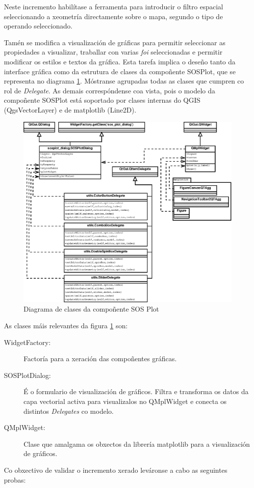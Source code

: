 Neste incremento habilítase a ferramenta para introducir o filtro espacial seleccionando a xeometría directamente sobre o mapa, segundo o tipo de operando seleccionado.

Tamén se modifica a visualización de gráficas para permitir seleccionar as propiedades a visualizar, traballar con varias \emph{foi} seleccionadas e permitir modificar os estilos e textos da gráfica. Esta tarefa implica o deseño tanto da interface gráfica como da estrutura de clases da compoñente SOSPlot, que se representa no diagrama \ref{fig:diaClassSOSPlot}. Móstranse agrupadas todas as clases que cumpren co rol de \emph{Delegate}. As demais correspóndense coa vista, pois o modelo da compoñente SOSPlot está soportado por clases internas do QGIS (QgsVectorLayer) e de matplotlib (Line2D).

\begin{figure}
 \centering
 \includegraphics[width=\textwidth]{images/clases_sos_plot.eps}
 \caption{Diagrama de clases da compoñente SOS Plot}
 \label{fig:diaClassSOSPlot}
\end{figure}

As clases máis relevantes da figura \ref{fig:diaClassSOSPlot} son:
\begin{description}
\item[WidgetFactory:] Factoría para a xeración das compoñentes gráficas.
\item[SOSPlotDialog:] É o formulario de visualización de gráficos. Filtra e transforma os datos da capa vectorial activa para visualizalos no QMplWidget e conecta os distintos \emph{Delegates} co modelo.
\item[QMplWidget:] Clase que amalgama os obxectos da librería matplotlib para a visualización de gráficos.
\end{description}
\newpage
Co obxectivo de validar o incremento xerado leváronse a cabo as seguintes probas:

